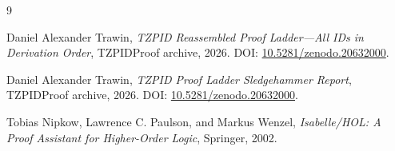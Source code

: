 \documentclass[11pt]{article}
\theoremstyle{remark}
\begin{document}
\begin{thebibliography}{9}

Daniel Alexander Trawin,
\emph{TZPID Reassembled Proof Ladder---All IDs in Derivation Order},
TZPIDProof archive, 2026.
DOI: \href{https://doi.org/10.5281/zenodo.20632000}{10.5281/zenodo.20632000}.

Daniel Alexander Trawin,
\emph{TZPID Proof Ladder Sledgehammer Report},
TZPIDProof archive, 2026.
DOI: \href{https://doi.org/10.5281/zenodo.20632000}{10.5281/zenodo.20632000}.

Tobias Nipkow, Lawrence C. Paulson, and Markus Wenzel,
\emph{Isabelle/HOL: A Proof Assistant for Higher-Order Logic},
Springer, 2002.

\end{thebibliography}
\end{document}
